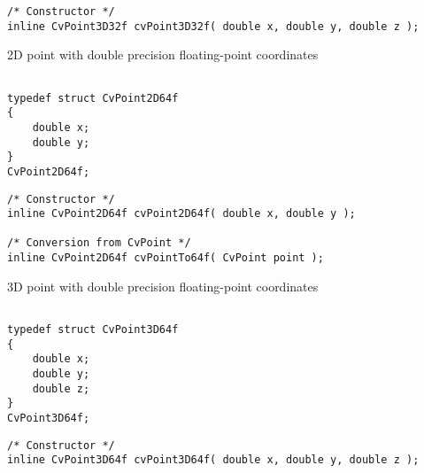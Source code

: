 \begin{description}
\end{description}

\begin{lstlisting}
/* Constructor */
inline CvPoint3D32f cvPoint3D32f( double x, double y, double z );

\end{lstlisting}


2D point with double precision floating-point coordinates

\begin{lstlisting}

typedef struct CvPoint2D64f
{
    double x; 
    double y; 
}
CvPoint2D64f;
\end{lstlisting}

\begin{description}
\end{description}

\begin{lstlisting}
/* Constructor */
inline CvPoint2D64f cvPoint2D64f( double x, double y );

/* Conversion from CvPoint */
inline CvPoint2D64f cvPointTo64f( CvPoint point );

\end{lstlisting}

\label{CvPoint3D64f}

3D point with double precision floating-point coordinates

\begin{lstlisting}

typedef struct CvPoint3D64f
{
    double x; 
    double y; 
    double z; 
}
CvPoint3D64f;
\end{lstlisting}

\begin{description}
\end{description}

\begin{lstlisting}
/* Constructor */
inline CvPoint3D64f cvPoint3D64f( double x, double y, double z );

\end{lstlisting}

\label{CvSize}

